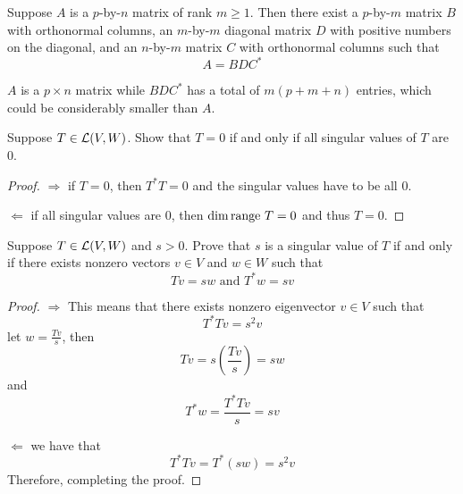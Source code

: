 \documentclass{extarticle}
\begin{document}
\begin{thm}
    Suppose \(A\) is a \(p\)-by-\(n\) matrix of rank \(m \geq 1\). Then there exist a \(p\)-by-\(m\) matrix 
    \(B\) with orthonormal columns, an \(m\)-by-\(m\) diagonal matrix \(D\) with positive numbers on 
    the diagonal, and an \(n\)-by-\(m\) matrix \(C\) with orthonormal columns such that 
    \[A = BDC^*\]
\end{thm}

\begin{remark}
    \(A\) is a \(p \times n\) matrix while \(BDC^*\) has a total of \(m(p+m+n)\) entries, which 
    could be considerably smaller than \(A\).
\end{remark}


\newpage 
{}

\begin{problem}{1}
    Suppose \(T \in \mathcal{L}(V, W)\). Show that \(T = 0\) if and only if all singular 
    values of \(T\) are 0.
\end{problem}

\begin{proof}
\(\Rightarrow\) if \(T = 0\), then \(T^*T = 0\) and the singular values have to be all 0. 

\(\Leftarrow\) if all singular values are 0, then \(\dim \text{range } T = 0\) and thus \(T = 0\).
\end{proof}

\begin{problem}{2}
    Suppose \(T \in \mathcal{L}(V, W)\) and \(s > 0\). Prove that \(s\) is a singular value of \(T\)
    if and only if there exists nonzero vectors \(v \in V\) and \(w \in W\) such that 
    \[Tv = sw \text{ and } T^* w = sv\]
\end{problem}

\begin{proof}

\(\Rightarrow\) This means that there exists nonzero eigenvector \(v \in V\) such that 
\[T^*T v = s^2 v\]
let \(w = \frac{Tv}{s}\), then 
\[Tv = s\left(\frac{Tv}{s}\right) = sw\]
and 
\[T^*w  = \frac{T^* Tv}{s} = sv\]

\(\Leftarrow\) we have that 
\[T^*Tv = T^*(sw) = s^2v\]
Therefore, completing the proof.
\end{proof}
\end{document}
